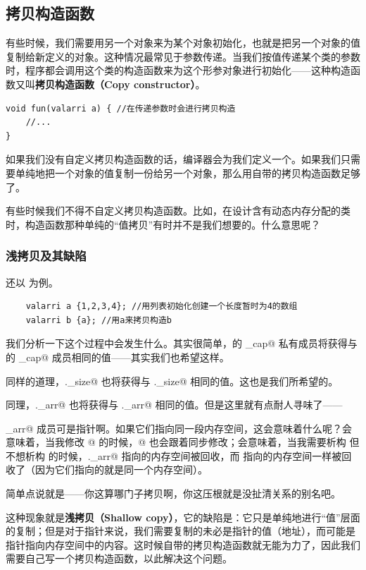 \subsection*{拷贝构造函数}
有些时候，我们需要用另一个对象来为某个对象初始化，也就是把另一个对象的值复制给新定义的对象。这种情况最常见于参数传递。当我们按值传递某个类的参数时，程序都会调用这个类的构造函数来为这个形参对象进行初始化——这种构造函数又叫\textbf{拷贝构造函数（Copy constructor）}。
\begin{lstlisting}
void fun(valarri a) { //在传递参数时会进行拷贝构造
    //...
}
\end{lstlisting}\par
如果我们没有自定义拷贝构造函数的话，编译器会为我们定义一个。如果我们只需要单纯地把一个对象的值复制一份给另一个对象，那么用自带的拷贝构造函数足够了。\par
有些时候我们不得不自定义拷贝构造函数。比如，在设计含有动态内存分配的类时，构造函数那种单纯的``值拷贝''有时并不是我们想要的。什么意思呢？\par
\subsubsection*{浅拷贝及其缺陷}
还以 \lstinline@valarri@ 为例。
\begin{lstlisting}
    valarri a {1,2,3,4}; //用列表初始化创建一个长度暂时为4的数组
    valarri b {a}; //用a来拷贝构造b
\end{lstlisting}
我们分析一下这个过程中会发生什么。其实很简单，\lstinline@b@ 的 \lstinline@_cap@ 私有成员将获得与 \lstinline@a@ 的 \lstinline@_cap@ 成员相同的值——其实我们也希望这样。\par
同样的道理，\lstinline@b._size@ 也将获得与 \lstinline@a._size@ 相同的值。这也是我们所希望的。\par
同理，\lstinline@b._arr@ 也将获得与 \lstinline@a._arr@ 相同的值。但是这里就有点耐人寻味了——\par
\lstinline@_arr@ 成员可是指针啊。如果它们指向同一段内存空间，这会意味着什么呢？会意味着，当我修改 \lstinline@a[0]@ 的时候，\lstinline@b[0]@ 也会跟着同步修改；会意味着，当我需要析构 \lstinline@a@ 但不想析构 \lstinline@b@ 的时候，\lstinline@a._arr@ 指向的内存空间被回收，而 \lstinline@b@ 指向的内存空间一样被回收了（因为它们指向的就是同一个内存空间）。\par
简单点说就是——你这算哪门子拷贝啊，你这压根就是没扯清关系的别名吧。\par
这种现象就是\textbf{浅拷贝（Shallow copy）}，它的缺陷是：它只是单纯地进行``值''层面的复制；但是对于指针来说，我们需要复制的未必是指针的值（地址），而可能是指针指向内存空间中的内容。这时候自带的拷贝构造函数就无能为力了，因此我们需要自己写一个拷贝构造函数，以此解决这个问题。\par
